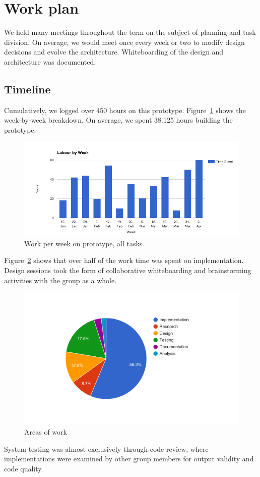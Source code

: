\section{Work plan}
We held many meetings throughout the term on the subject of planning and task division. On average, we would meet once every week or two to modify design decisions and evolve the architecture. Whiteboarding of the design and architecture was documented.

\subsection{Timeline}
Cumulatively, we logged over 450 hours on this prototype. Figure~\ref{fig:work-per-week} shows the week-by-week breakdown. On average, we spent 38.125 hours building the prototype. 

\begin{figure}[tbph]
  \centering
  \includegraphics[width=0.85\linewidth]{graphics/work-per-week}
  \caption{Work per week on prototype, all tasks}
  \label{fig:work-per-week}
\end{figure}

Figure~\ref{fig:work-pie} shows that over half of the work time was spent on implementation. Design sessions took the form of collaborative whiteboarding and brainstorming activities with the group as a whole. 

\begin{figure}[tbph]
  \centering
  \includegraphics[width=0.7\linewidth]{graphics/work-pie}
  \caption{Areas of work}
  \label{fig:work-pie}
\end{figure}

System testing was almost exclusively through code review, where implementations were examined by other group members for output validity and code quality.


